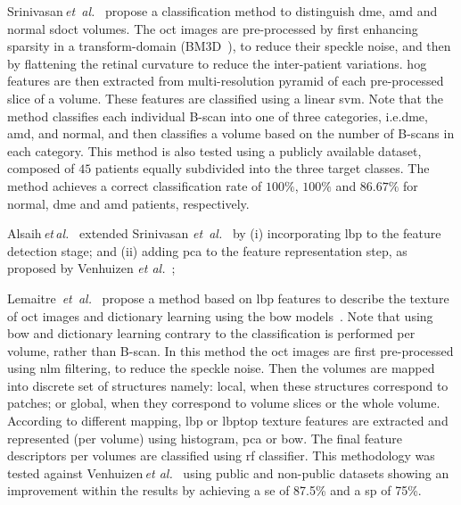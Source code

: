 %
Srinivasan\,\textit{et~al.}~\cite{Srinivasan2014} propose a classification method to distinguish \gls{dme}, \gls{amd} and normal \gls{sdoct} volumes.
%
The \gls{oct} images are pre-processed by first enhancing sparsity in a transform-domain (BM3D~\cite{dabov2007image}), to reduce their speckle noise, and then by flattening the retinal curvature to reduce the inter-patient variations.
\gls{hog} features are then extracted from multi-resolution pyramid of each pre-processed slice of a volume.
These features are classified using a linear \gls{svm}.
Note that the method classifies each individual B-scan into one of three categories, i.e.\gls{dme}, \gls{amd}, and normal, and then classifies a volume based on the number of B-scans in each category.
%
This method is also tested using a publicly available dataset, composed of $45$ patients equally subdivided into the three target classes.
The method achieves a correct classification rate of $100 \%$, $100 \%$ and $86.67 \%$ for normal, \gls{dme} and \gls{amd} patients, respectively.

Alsaih\,\emph{et\,al.}~\cite{Alsaih2016apr-repoICPR} extended Srinivasan \textit{et~al.}~\cite{Srinivasan2014} by
(i) incorporating \gls{lbp} to the feature detection stage;
and (ii) adding \gls{pca} to the feature representation step, as proposed by Venhuizen \textit{et al.}~\cite{Venhuizen2015};

Lemaitre~\emph{et~al.}~\cite{Lemaintre2015miccaiOCT} propose a method based on \gls{lbp} features to describe the texture of \gls{oct} images and dictionary learning using the \gls{bow} models~\cite{Sivic2003}.
Note that using \gls{bow} and dictionary learning contrary to \cite{Srinivasan2014} the classification is performed per volume, rather than B-scan.
In this method the \gls{oct} images are first pre-processed using \gls{nlm} filtering, to reduce the speckle noise.
Then the volumes are mapped into discrete set of structures namely: local, when these structures correspond to patches; or global, when they correspond to volume slices or the whole volume.
According to different mapping, \gls{lbp} or \gls{lbptop} texture features are extracted and represented (per volume) using histogram, \gls{pca} or \gls{bow}.
The final feature descriptors per volumes are classified using \gls{rf} classifier.
This methodology was tested against Venhuizen\,\textit{et al.}~\cite{Venhuizen2015} using public and non-public datasets showing an improvement within the results by achieving a \gls{se} of 87.5\% and a \gls{sp} of 75\%.

